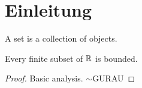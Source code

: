 \chapter{Einleitung}


\begin{definition}[def]
    A set is a collection of objects.
\end{definition}

\begin{theorem}[trivial]
Every finite subset of $\mathbb{R}$ is bounded.
\end{theorem}

\begin{proof}
Basic analysis. $\sim$GURAU
\end{proof}



